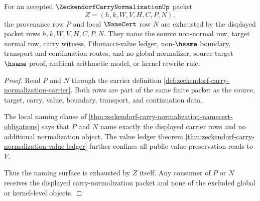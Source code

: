 \begin{theorem}
\label{thm:zeckendorf-carry-normalization-local-naming-exhaustion}
For an accepted $\ZeckendorfCarryNormalizationUp$ packet
$$
Z=(h,k,W,V,H,C,P,N),
$$
the provenance row $P$ and local $\NameCert$ row $N$ are exhausted by the
displayed packet rows $h,k,W,V,H,C,P,N$. They name the source non-normal row,
target normal row, carry witness, Fibonacci-value ledger, non-$\hsame$
boundary, transport and continuation routes, and no global normalizer,
source-target $\hsame$ proof, ambient arithmetic model, or kernel rewrite rule.
\end{theorem}
\begin{proof}
Read $P$ and $N$ through the carrier definition
\autoref{def:zeckendorf-carry-normalization-carrier}. Both rows are part of
the same finite packet as the source, target, carry, value, boundary,
transport, and continuation data.

The local naming clause of
\autoref{thm:zeckendorf-carry-normalization-namecert-obligations} says that
$P$ and $N$ name exactly the displayed carrier rows and no additional
normalization object. The value ledger theorem
\autoref{thm:zeckendorf-carry-normalization-value-ledger} further confines all
public value-preservation reads to $V$.

Thus the naming surface is exhausted by $Z$ itself. Any consumer of $P$ or $N$
receives the displayed carry-normalization packet and none of the excluded
global or kernel-level objects.
\end{proof}

